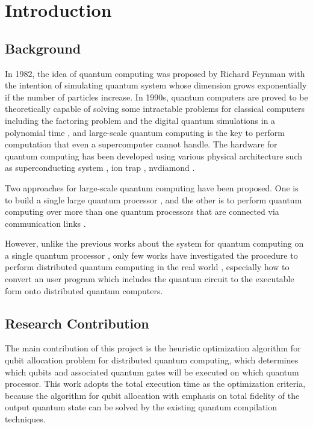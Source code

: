 \chapter{Introduction}
\label{introduction}

\section{Background}
\label{introduction:background}
 In 1982, the idea of quantum computing was proposed by Richard Feynman \cite{Feynman} with the intention of simulating quantum system whose dimension grows exponentially if the number of particles increase.  In 1990s, quantum computers are proved to be theoretically capable of solving some intractable problems for classical computers including the factoring problem \cite{Shor} and the digital quantum simulations in a polynomial time \cite{Lloyd}, and large-scale quantum computing is the key to perform computation that even a supercomputer cannot handle.  The hardware for quantum computing has been developed using various physical architecture such as superconducting system \cite{superconducting}, ion trap \cite{iontrap}, nvdiamond \cite{nvdiamond}.
 
  Two approaches for large-scale quantum computing have been proposed. One is to build a single large quantum processor \cite{rsa}, and the other is to perform quantum computing over more than one quantum processors that are connected via communication links \cite{grover}.  
 
 However, unlike the previous works about the system for quantum computing on a single quantum processor \cite{qubitallocation, noisy},  only few works have investigated the procedure to perform distributed quantum computing in the real world \cite{qmpi}, especially how to convert an user program which includes the quantum circuit to the executable form onto distributed quantum computers.

\section{Research Contribution}
\label{introduction:research_contribution}
The main contribution of this project is the heuristic optimization algorithm for qubit allocation problem for distributed quantum computing, which determines which qubits and associated quantum gates will be executed on which quantum processor.  This work adopts the total execution time as the optimization criteria, because the algorithm for qubit allocation with emphasis on total fidelity of the output quantum state can be solved by the existing quantum compilation techniques.　

